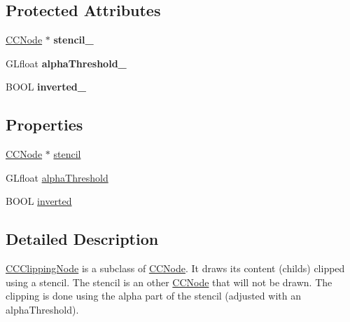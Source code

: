 \subsection*{Protected Attributes}
\begin{DoxyCompactItemize}
\item 
\hypertarget{interface_c_c_clipping_node_a83cc323b170d5e25acc93d9eb490c338}{\hyperlink{class_c_c_node}{C\-C\-Node} $\ast$ {\bfseries stencil\-\_\-}}\label{interface_c_c_clipping_node_a83cc323b170d5e25acc93d9eb490c338}

\item 
\hypertarget{interface_c_c_clipping_node_a8fd19332962fa63959cc86ef2b54c556}{G\-Lfloat {\bfseries alpha\-Threshold\-\_\-}}\label{interface_c_c_clipping_node_a8fd19332962fa63959cc86ef2b54c556}

\item 
\hypertarget{interface_c_c_clipping_node_ab9badc0b7fb4aa246a1040e409bfd9d0}{B\-O\-O\-L {\bfseries inverted\-\_\-}}\label{interface_c_c_clipping_node_ab9badc0b7fb4aa246a1040e409bfd9d0}

\end{DoxyCompactItemize}
\subsection*{Properties}
\begin{DoxyCompactItemize}
\item 
\hyperlink{class_c_c_node}{C\-C\-Node} $\ast$ \hyperlink{interface_c_c_clipping_node_a59636e24024ad61ad41df1c2cc643452}{stencil}
\item 
G\-Lfloat \hyperlink{interface_c_c_clipping_node_a94ce5211cf91e156a8c294291a81cf48}{alpha\-Threshold}
\item 
B\-O\-O\-L \hyperlink{interface_c_c_clipping_node_a78d5892a56ab1d689412495ba1a3d0e9}{inverted}
\end{DoxyCompactItemize}


\subsection{Detailed Description}
\hyperlink{interface_c_c_clipping_node}{C\-C\-Clipping\-Node} is a subclass of \hyperlink{class_c_c_node}{C\-C\-Node}. It draws its content (childs) clipped using a stencil. The stencil is an other \hyperlink{class_c_c_node}{C\-C\-Node} that will not be drawn. The clipping is done using the alpha part of the stencil (adjusted with an alpha\-Threshold). 

